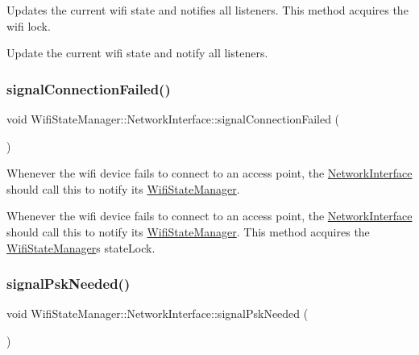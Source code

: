 Updates the current wifi state and notifies all listeners. This method acquires the wifi lock.

Update the current wifi state and notify all listeners. \mbox{\label{classWifiStateManager_1_1NetworkInterface_a998596cc24e160b1c13de43b17e104c6}} 
\subsubsection{\texorpdfstring{signal\+Connection\+Failed()}{signalConnectionFailed()}}
{\footnotesize\ttfamily void Wifi\+State\+Manager\+::\+Network\+Interface\+::signal\+Connection\+Failed (\begin{DoxyParamCaption}{ }\end{DoxyParamCaption})\hspace{0.3cm}{\ttfamily [protected]}}

Whenever the wifi device fails to connect to an access point, the \mbox{\hyperlink{classWifiStateManager_1_1NetworkInterface}{Network\+Interface}} should call this to notify its \mbox{\hyperlink{classWifiStateManager}{Wifi\+State\+Manager}}.

Whenever the wifi device fails to connect to an access point, the \mbox{\hyperlink{classWifiStateManager_1_1NetworkInterface}{Network\+Interface}} should call this to notify its \mbox{\hyperlink{classWifiStateManager}{Wifi\+State\+Manager}}. This method acquires the \mbox{\hyperlink{classWifiStateManager}{Wifi\+State\+Manager}}\textquotesingle{}s state\+Lock. \mbox{\label{classWifiStateManager_1_1NetworkInterface_a88b943e2cf2e694e40ee84974f09fb22}} 
\subsubsection{\texorpdfstring{signal\+Psk\+Needed()}{signalPskNeeded()}}
{\footnotesize\ttfamily void Wifi\+State\+Manager\+::\+Network\+Interface\+::signal\+Psk\+Needed (\begin{DoxyParamCaption}{ }\end{DoxyParamCaption})\hspace{0.3cm}{\ttfamily [protected]}}

